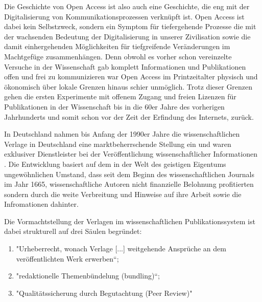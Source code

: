 Die Geschichte von Open Access ist also auch eine Geschichte, die eng mit der Digitalisierung von Kommunikationsprozessen verknüpft ist\cite{albert_2006_open_implications}. Open Access ist dabei kein Selbstzweck\cite{cite:17d}, sondern ein Symptom für tiefergehende Prozesse die mit der wachsenden Bedeutung der Digitalisierung in unserer Zivilisation sowie die damit einhergehenden Möglichkeiten für tiefgreifende Veränderungen im Machtgefüge zusammenhängen\cite{cite:17e}. Denn obwohl es vorher schon vereinzelte Versuche in der Wissenschaft gab komplett Informationen und Publikationen offen und frei zu kommunizieren war Open Access im Printzeitalter physisch und ökonomisch über lokale Grenzen hinaus schier unmöglich\cite{cite:18a}. Trotz dieser Grenzen gehen die ersten Experimente mit offenem Zugang und freien Lizenzen für Publikationen in der Wissenschaft bis in die 60er Jahre des vorherigen Jahrhunderts und somit schon vor der Zeit der Erfindung des Internets, zurück\cite{cite:18b}. 

In Deutschland nahmen bis Anfang der 1990er Jahre die wissenschaftlichen Verlage in Deutschland eine marktbeherrschende Stellung ein und waren exklusiver Dienstleister bei der Veröffentlichung wissenschaftlicher Informationen \cite{schloegl_2005}\cite{offhaus_2012_institutionelle_repos}. Die Entwicklung basiert auf dem in der Welt des geistigen Eigentums ungewöhnlichen Umstand, dass seit dem Beginn des wissenschaftlichen Journals im Jahr 1665, wissenschaftliche Autoren nicht finanzielle Belohnung profitierten sondern durch die weite Verbreitung und Hinweise auf ihre Arbeit sowie die Infromationen dahinter\cite{albert_2006_open_implications}.

Die Vormachtstellung der Verlagen im wissenschaftlichen Publikationssystem ist dabei strukturell auf drei Säulen begründet\cite{offhaus_2012_institutionelle_repos}\cite{bargheer_2006_open}: 
\begin{enumerate}
\item  "Urheberrecht, wonach Verlage [...] weitgehende Ansprüche an dem veröffentlichten Werk erwerben“;
\item "redaktionelle Themenbündelung (bundling)“;
\item "Qualitätssicherung durch Begutachtung (Peer Review)"
\end{enumerate}

